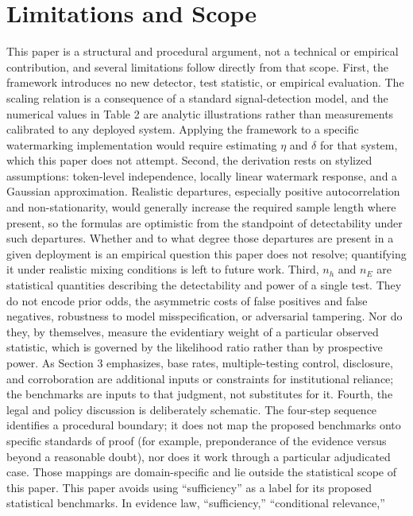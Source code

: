 \documentclass[11pt]{article}
\begin{document}
\section{Limitations and Scope}
This paper is a structural and procedural argument, not a technical or empirical
contribution, and several limitations follow directly from that scope.
First, the framework introduces no new detector, test statistic, or empirical
evaluation. The scaling relation is a consequence of a standard signal-detection
model, and the numerical values in Table 2 are analytic illustrations rather than
measurements calibrated to any deployed system. Applying the framework to a specific
watermarking implementation would require estimating $\eta$ and $\delta$ for that
system, which this paper does not attempt.
Second, the derivation rests on stylized assumptions: token-level independence,
locally linear watermark response, and a Gaussian approximation. Realistic
departures, especially positive autocorrelation and non-stationarity, would
generally increase the required sample length where present, so the formulas are
optimistic from the standpoint of detectability under such departures. Whether and
to what degree those departures are present in a given deployment is an empirical
question this paper does not resolve; quantifying it under realistic mixing
conditions is left to future work.
Third, $n_h$ and $n_E$ are statistical quantities describing the detectability and
power of a single test. They do not encode prior odds, the asymmetric costs of false
positives and false negatives, robustness to model misspecification, or adversarial
tampering. Nor do they, by themselves, measure the evidentiary weight of a
particular observed statistic, which is governed by the likelihood ratio rather
than by prospective power. As Section 3 emphasizes, base rates, multiple-testing
control, disclosure, and corroboration are additional inputs or constraints for
institutional reliance; the benchmarks are inputs to that judgment, not
substitutes for it.
Fourth, the legal and policy discussion is deliberately schematic. The four-step
sequence identifies a procedural boundary; it does not map the proposed benchmarks
onto specific standards of proof (for example, preponderance of the evidence versus
beyond a reasonable doubt), nor does it work through a particular adjudicated case.
Those mappings are domain-specific and lie outside the statistical scope of this
paper.
This paper avoids using ``sufficiency'' as a label for its proposed statistical
benchmarks. In evidence law, ``sufficiency,'' ``conditional relevance,''
\end{document}
